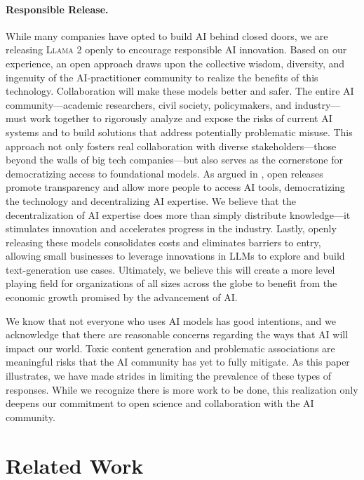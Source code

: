 \paragraph{Responsible Release.} While many companies have opted to build AI behind closed doors, we are releasing \textsc{Llama 2} openly to encourage responsible AI innovation. Based on our experience, an open approach draws upon the collective wisdom, diversity, and ingenuity of the AI-practitioner community to realize the benefits of this technology. Collaboration will make these models better and safer. The entire AI community—academic researchers, civil society, policymakers, and industry—must work together to rigorously analyze and expose the risks of current AI systems and to build solutions that address potentially problematic misuse. This approach not only fosters real collaboration with diverse stakeholders—those beyond the walls of big tech companies—but also serves as the cornerstone for democratizing access to foundational models. As argued in \cite{zellers2019defending}, open releases promote transparency and allow more people to access AI tools, democratizing the technology and decentralizing AI expertise. We believe that the decentralization of AI expertise does more than simply distribute knowledge—it stimulates innovation and accelerates progress in the industry. Lastly, openly releasing these models consolidates costs and eliminates barriers to entry, allowing small businesses to leverage innovations in LLMs to explore and build text-generation use cases. Ultimately, we believe this will create a more level playing field for organizations of all sizes across the globe to benefit from the economic growth promised by the advancement of AI. 

We know that not everyone who uses AI models has good intentions, and we acknowledge that there are reasonable concerns regarding the ways that AI will impact our world. Toxic content generation and problematic associations are meaningful risks that the AI community has yet to fully mitigate. As this paper illustrates, we have made strides in limiting the prevalence of these types of responses. While we recognize there is more work to be done, this realization only deepens our commitment to open science and collaboration with the AI community.

\section{Related Work}
\label{sec:related_works}

